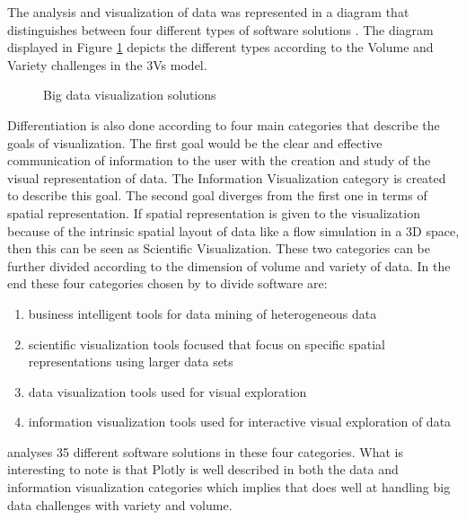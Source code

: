 The analysis and visualization of data was represented in a diagram that distinguishes between four different types of software solutions \cite{caldarola2017big}. The diagram displayed in Figure \ref{fig:10} depicts the different types according to the Volume and Variety challenges in the 3Vs model. 
\begin{figure}[H]
	\centering{}
	\caption{Big data visualization solutions}\label{fig:10}
\end{figure}
Differentiation is also done according to four main categories that describe the goals of visualization. The first goal would be the clear and effective communication of information to the user with the creation and study of the visual representation of data. The Information Visualization category is created to describe this goal. The second goal diverges from the first one in terms of spatial representation. If spatial representation is given to the visualization because of the intrinsic spatial layout of data like a flow simulation in a 3D space, then this can be seen as Scientific Visualization. These two categories can be further divided according to the dimension of volume and variety of data. In the end these four categories chosen by \cite{caldarola2017big} to divide software are:
\begin{enumerate}
	\item business intelligent tools for data mining of heterogeneous data
	\item scientific visualization tools focused that focus on specific spatial representations using larger data sets
	\item data visualization tools used for visual exploration
	\item information visualization tools used for interactive visual exploration of data
\end{enumerate}
\cite{caldarola2017big} analyses 35 different software solutions in these four categories. What is interesting to note is that Plotly is well described in both the data and information visualization categories which implies that does well at handling big data challenges with variety and volume.

